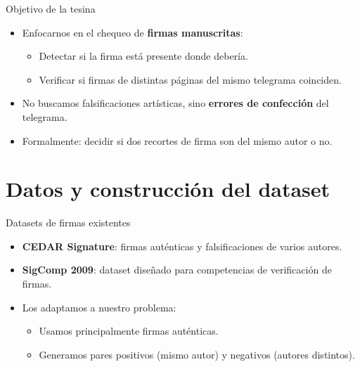 \documentclass{beamer}
\begin{document}
\begin{frame}{Objetivo de la tesina}
  \begin{itemize}
    \item Enfocarnos en el chequeo de \textbf{firmas manuscritas}:
      \begin{itemize}
        \item Detectar si la firma está presente donde debería.
        \item Verificar si firmas de distintas páginas del mismo telegrama coinciden.
      \end{itemize}
    \item No buscamos falsificaciones artísticas, sino \textbf{errores de confección} del telegrama.
    \item Formalmente: decidir si dos recortes de firma son del mismo autor o no.
  \end{itemize}
\end{frame}


\section{Datos y construcción del dataset}

\begin{frame}{Datasets de firmas existentes}
  \begin{itemize}
    \item \textbf{CEDAR Signature}: firmas auténticas y falsificaciones de varios autores.
    \item \textbf{SigComp 2009}: dataset diseñado para competencias de verificación de firmas.
    \item Los adaptamos a nuestro problema:
      \begin{itemize}
        \item Usamos principalmente firmas auténticas.
        \item Generamos pares positivos (mismo autor) y negativos (autores distintos).
      \end{itemize}
  \end{itemize}
\end{frame}
\end{document}
